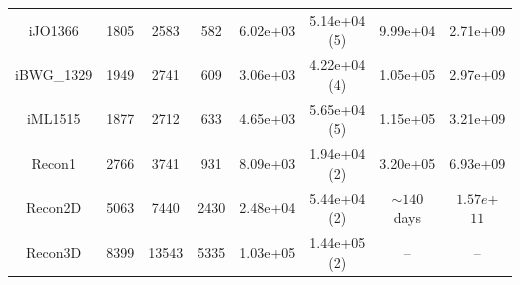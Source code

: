 \documentclass{beamer}
\begin{document}
\begin{frame}
\begin{table}[]
{\begin{tabular}{|c||c|c|c||c|c||c|c|}
               iJO1366  & 1805 & 2583 & 582 & 6.02e+03 & 5.14e+04 (5)  & 9.99e+04  & 2.71e+09 \\
               iBWG\_1329 & 1949 & 2741 & 609 & 3.06e+03 & 4.22e+04 (4) & 1.05e+05   & 2.97e+09 \\
               iML1515 & 1877 & 2712 & 633 &  4.65e+03 & 5.65e+04 (5)  & 1.15e+05   & 3.21e+09 \\
               Recon1 & 2766 & 3741 & 931 & 8.09e+03 & 1.94e+04 (2) & 3.20e+05  & 6.93e+09 \\
               Recon2D & 5063 & 7440 & 2430 & 2.48e+04  &  5.44e+04 (2)  & $\sim 140$ days & $1.57e$+$11$   \\
               Recon3D  & 8399 & 13543 & 5335 & 1.03e+05 &  1.44e+05 (2) & -- & -- \\
               \hline
               \end{tabular}%
         }
      \end{table}

   \end{frame}
   \fi
\end{document}

